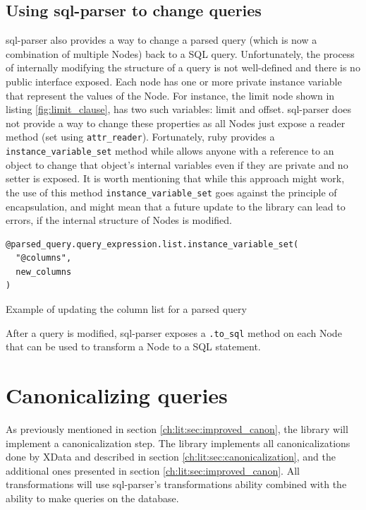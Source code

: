 \subsection{Using sql-parser to change queries}
sql-parser also provides a way to change a parsed query (which is now a combination of multiple Nodes) back to a SQL query. Unfortunately, the process of internally modifying the structure of a query is not well-defined and there is no public interface exposed. Each node has one or more private instance variable that represent the values of the Node. For instance, the limit node shown in listing \ref{fig:limit_clause}, has two such variables: limit and offset. sql-parser does not provide a way to change these properties as all Nodes just expose a reader method (set using \texttt{attr_reader}). Fortunately, ruby provides a \texttt{instance_variable_set} method while allows anyone with a reference to an object to change that object's internal variables even if they are private and no setter is exposed. It is worth mentioning that while this approach might work, the use of this method \texttt{instance_variable_set} goes against the principle of encapsulation, and might mean that a future update to the library can lead to errors, if the internal structure of Nodes is modified.

\begin{listing}
\begin{verbatim}
@parsed_query.query_expression.list.instance_variable_set(
  "@columns",
  new_columns
)
\end{verbatim}
\caption{Example of updating the column list for a parsed query}
\end{listing}

After a query is modified, sql-parser exposes a \texttt{.to_sql} method on each Node that can be used to transform a Node to a SQL statement.

\section{Canonicalizing queries}

As previously mentioned in section \ref{ch:lit:sec:improved_canon}, the library will implement a canonicalization step. The library implements all canonicalizations done by XData and described in section \ref{ch:lit:sec:canonicalization}, and the additional ones presented in section \ref{ch:lit:sec:improved_canon}. All transformations will use sql-parser's transformations ability combined with the ability to make queries on the database.

